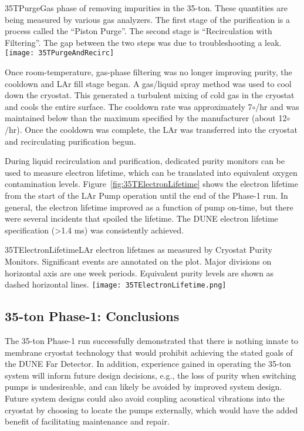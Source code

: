 \begin{cdrfigure}{35TPurge}{Gas phase of removing impurities in the 35-ton. These quantities are being measured by various gas analyzers. The first stage of the purification is a process called the ``Piston Purge''.  The second stage is ``Recirculation with Filtering''. The gap between the two steps was due to troubleshooting a leak.}
  \texttt{[image: 35TPurgeAndRecirc]}
\end{cdrfigure}

Once room-temperature, gas-phase filtering was no longer improving purity, 
the cooldown and LAr fill stage began. 
A gas/liquid spray method was used to cool down the cryostat. 
This generated a turbulent mixing of cold gas in the cryostat and cools the entire surface.
The cooldown rate was approximately 7$\circ$/hr and was maintained below than the 
maximum specified by the manufacturer (about 12$\circ$/hr).
Once the cooldown was complete, the LAr was transferred into the cryostat and recirculating 
purification begun.

During liquid recirculation and purification, dedicated
purity monitors can be used to measure electron lifetime, which can 
be translated into equivalent oxygen contamination levels.
Figure~\ref{fig:35TElectronLifetime} shows the electron lifetime from the start of the
LAr Pump operation until the end of the Phase-1 run. 
In general, the electron lifetime improved as a function of pump 
on-time, but there were several incidents that spoiled the lifetime.
The DUNE electron lifetime specification (>1.4 ms) was consistently achieved.

\begin{cdrfigure}{35TElectronLifetime}{LAr electron lifetmes as measured by 
Cryostat Purity Monitors. Significant events are annotated on the plot. Major divisions on horizontal axis 
are one week periods. Equivalent purity levels are shown as dashed horizontal lines.}
  \texttt{[image: 35TElectronLifetime.png]}
\end{cdrfigure}

\subsection{35-ton Phase-1: Conclusions}
The 35-ton Phase-1 run successfully demonstrated that there is nothing innate to
membrane cryostat technology that would prohibit achieving the stated goals of the
DUNE Far Detector. In addition, experience gained in operating the 35-ton system
will inform future design decisions, e.g., the loss of purity when switching pumps is
undesireable, and can likely be avoided by improved system design. Future system
designs could also avoid coupling acoustical vibrations into the cryostat by choosing
to locate the pumps externally, which would have the added benefit of facilitating
maintenance and repair.

